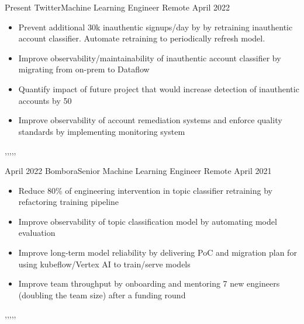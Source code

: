 \begin{experiences}
  \experience
    {Present}   {Twitter}{Machine Learning Engineer} {Remote}
    {April 2022}
    {
      \begin{itemize}
        \item Prevent additional 30k inauthentic signups/day by by retraining inauthentic account classifier. Automate retraining to periodically refresh model.
        \item Improve observability/maintainability of inauthentic account classifier by migrating from on-prem to Dataflow
        \item Quantify impact of future project that would increase detection of inauthentic accounts by 50%
        \item Improve observability of account remediation systems and enforce quality standards by implementing monitoring system
      \end{itemize}
    }
    {\vertex,\dataflow,\tf,\airflow,\scalding,\bazel}
  \emptySeparator

  \experience
    {April 2022}   {Bombora}{Senior Machine Learning Engineer} {Remote}
    {April 2021}
    {
      \begin{itemize}
        \item Reduce 80\% of engineering intervention in topic classifier retraining by refactoring training pipeline
        \item Improve observability of topic classification model by automating model evaluation
        \item Improve long-term model reliability by delivering PoC and migration plan  for using kubeflow/Vertex AI to train/serve models
        \item Improve team throughput by onboarding and mentoring 7 new engineers (doubling the team size) after a funding round
      \end{itemize}
    }
    {\mlflow,\pytorch,\spacy,\kubeflow,\gke,\airflow}
  \emptySeparator


\end{experiences}
